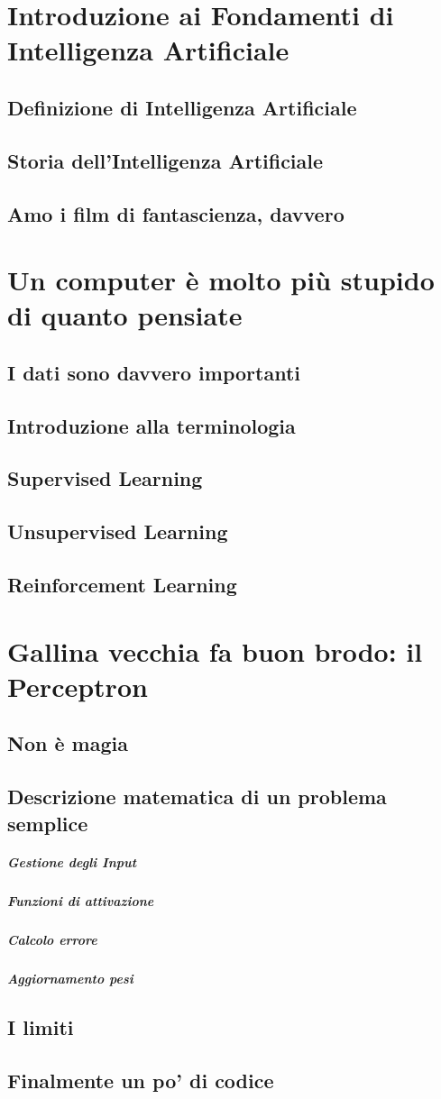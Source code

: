 \documentclass[12pt,a4paper]{article}
\begin{document}
\section{Introduzione ai Fondamenti di Intelligenza Artificiale}
\subsection{Definizione di Intelligenza Artificiale}

\subsection{Storia dell'Intelligenza Artificiale}
\subsection{Amo i film di fantascienza, davvero}

\section{Un computer è molto più stupido di quanto pensiate}
\subsection{I dati sono davvero importanti}
\subsection{Introduzione alla terminologia}
\subsection{Supervised Learning}
\subsection{Unsupervised Learning}
\subsection{Reinforcement Learning}

\section{Gallina vecchia fa buon brodo: il Perceptron}
\subsection{Non è magia}
\subsection{Descrizione matematica di un problema semplice}
\subparagraph{Gestione degli Input}
\subparagraph{Funzioni di attivazione}
\subparagraph{Calcolo errore}
\subparagraph{Aggiornamento pesi}
\subsection{I limiti}
\subsection{Finalmente un po' di codice}
\end{document}
